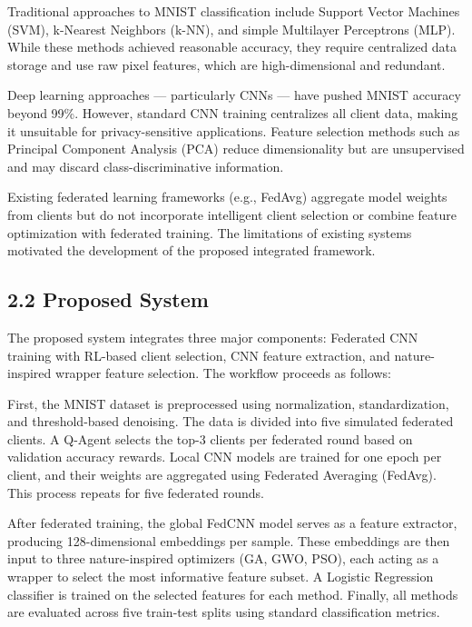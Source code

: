 \documentclass[
]{article}
\begin{document}
Traditional approaches to MNIST classification include Support Vector
Machines (SVM), k-Nearest Neighbors (k-NN), and simple Multilayer
Perceptrons (MLP). While these methods achieved reasonable accuracy,
they require centralized data storage and use raw pixel features, which
are high-dimensional and redundant.

Deep learning approaches --- particularly CNNs --- have pushed MNIST
accuracy beyond 99\%. However, standard CNN training centralizes all
client data, making it unsuitable for privacy-sensitive applications.
Feature selection methods such as Principal Component Analysis (PCA)
reduce dimensionality but are unsupervised and may discard
class-discriminative information.

Existing federated learning frameworks (e.g., FedAvg) aggregate model
weights from clients but do not incorporate intelligent client selection
or combine feature optimization with federated training. The limitations
of existing systems motivated the development of the proposed integrated
framework.

\hypertarget{proposed-system}{%
\subsection{2.2 Proposed System}\label{proposed-system}}

The proposed system integrates three major components: Federated CNN
training with RL-based client selection, CNN feature extraction, and
nature-inspired wrapper feature selection. The workflow proceeds as
follows:

First, the MNIST dataset is preprocessed using normalization,
standardization, and threshold-based denoising. The data is divided into
five simulated federated clients. A Q-Agent selects the top-3 clients
per federated round based on validation accuracy rewards. Local CNN
models are trained for one epoch per client, and their weights are
aggregated using Federated Averaging (FedAvg). This process repeats for
five federated rounds.

After federated training, the global FedCNN model serves as a feature
extractor, producing 128-dimensional embeddings per sample. These
embeddings are then input to three nature-inspired optimizers (GA, GWO,
PSO), each acting as a wrapper to select the most informative feature
subset. A Logistic Regression classifier is trained on the selected
features for each method. Finally, all methods are evaluated across five
train-test splits using standard classification metrics.
\end{document}

